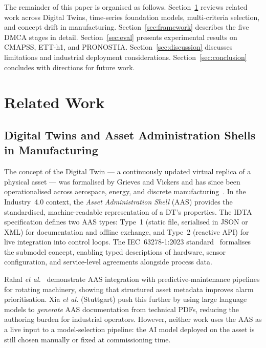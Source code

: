 \documentclass[12pt,a4paper]{article}
\begin{document}
The remainder of this paper is organised as follows.
Section~\ref{sec:related} reviews related work across Digital Twins,
time-series foundation models, multi-criteria selection, and
concept drift in manufacturing.
Section~\ref{sec:framework} describes the five DMCA stages in detail.
Section~\ref{sec:eval} presents experimental results on CMAPSS, ETT-h1,
and PRONOSTIA.
Section~\ref{sec:discussion} discusses limitations and industrial
deployment considerations.
Section~\ref{sec:conclusion} concludes with directions for future work.

\section{Related Work}
\label{sec:related}

\subsection{Digital Twins and Asset Administration Shells in Manufacturing}
\label{subsec:rel-dt}

The concept of the Digital Twin --- a continuously updated virtual
replica of a physical asset --- was formalised by Grieves and Vickers
and has since been operationalised across aerospace, energy, and
discrete manufacturing~\cite{Tao2019DTIndustry}.
In the Industry~4.0 context, the \emph{Asset Administration Shell}
(AAS) provides the standardised, machine-readable representation of
a DT's properties.
The IDTA specification defines two AAS types: Type~1 (static file,
serialised in JSON or XML) for documentation and offline exchange, and
Type~2 (reactive API) for live integration into control loops.
The IEC~63278-1:2023 standard~\cite{IDTA_AAS} formalises the
submodel concept, enabling typed descriptions of hardware, sensor
configuration, and service-level agreements alongside process data.

Rahal \textit{et al.}~\cite{nectoux2012pronostia} demonstrate AAS
integration with predictive-maintenance pipelines for rotating
machinery, showing that structured asset metadata improves alarm
prioritisation.
Xia \textit{et al.} (Stuttgart) push this further by using large
language models to \emph{generate} AAS documentation from technical
PDFs, reducing the authoring burden for industrial operators.
However, neither work uses the AAS as a live input to a
model-selection pipeline: the AI model deployed on the asset is
still chosen manually or fixed at commissioning time.
\end{document}
